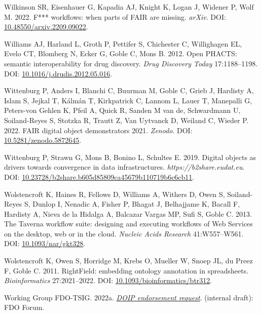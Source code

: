 \begin{CSLReferences}{1}{0}
\leavevmode{}%
Wilkinson SR, Eisenhauer G, Kapadia AJ, Knight K, Logan J, Widener P, Wolf M. 2022. F*** workflows: when parts of FAIR are missing. \emph{arXiv}. DOI: \href{https://doi.org/10.48550/arxiv.2209.09022}{10.48550/arxiv.2209.09022}.

\leavevmode{}%
Williams AJ, Harland L, Groth P, Pettifer S, Chichester C, Willighagen EL, Evelo CT, Blomberg N, Ecker G, Goble C, Mons B. 2012. Open PHACTS: semantic interoperability for drug discovery. \emph{Drug Discovery Today} 17:1188--1198. DOI: \href{https://doi.org/10.1016/j.drudis.2012.05.016}{10.1016/j.drudis.2012.05.016}.

\leavevmode{}%
Wittenburg P, Anders I, Blanchi C, Buurman M, Goble C, Grieb J, Hardisty A, Islam S, Jejkal T, Kálmán T, Kirkpatrick C, Lannom L, Lauer T, Manepalli G, Peters-von Gehlen K, Pfeil A, Quick R, Sanden M van de, Schwardmann U, Soiland-Reyes S, Stotzka R, Trautt Z, Van Uytvanck D, Weiland C, Wieder P. 2022. FAIR digital object demonstrators 2021. \emph{Zenodo}. DOI: \href{https://doi.org/10.5281/zenodo.5872645}{10.5281/zenodo.5872645}.

\leavevmode{}%
Wittenburg P, Strawn G, Mons B, Bonino L, Schultes E. 2019. Digital objects as drivers towards convergence in data infrastructures. \emph{https://b2share.eudat.eu}. DOI: \href{https://doi.org/10.23728/b2share.b605d85809ca45679b110719b6c6cb11}{10.23728/b2share.b605d85809ca45679b110719b6c6cb11}.

\leavevmode{}%
Wolstencroft K, Haines R, Fellows D, Williams A, Withers D, Owen S, Soiland-Reyes S, Dunlop I, Nenadic A, Fisher P, Bhagat J, Belhajjame K, Bacall F, Hardisty A, Nieva de la Hidalga A, Balcazar Vargas MP, Sufi S, Goble C. 2013. The Taverna workflow suite: designing and executing workflows of Web Services on the desktop, web or in the cloud. \emph{Nucleic Acids Research} 41:W557--W561. DOI: \href{https://doi.org/10.1093/nar/gkt328}{10.1093/nar/gkt328}.

\leavevmode{}%
Wolstencroft K, Owen S, Horridge M, Krebs O, Mueller W, Snoep JL, du Preez F, Goble C. 2011. RightField: embedding ontology annotation in spreadsheets. \emph{Bioinformatics} 27:2021--2022. DOI: \href{https://doi.org/10.1093/bioinformatics/btr312}{10.1093/bioinformatics/btr312}.

\leavevmode{}%
Working Group FDO-TSIG. 2022a. \emph{\href{https://docs.google.com/document/d/1me0L8C5yDe39cYP1Sxud4Y10hxhphOimLB-K-KgHQUk/edit}{DOIP endorsement request}}. (internal draft): FDO Forum.


\end{CSLReferences}
